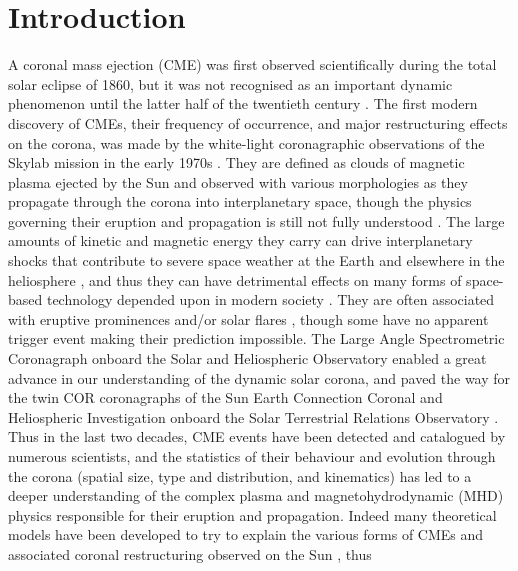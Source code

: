 \documentclass[namedreferences]{SolarPhysics}
\begin{document}
\begin{article}
\begin{opening}
%


\end{opening}

%

\section{Introduction}

A coronal mass ejection (CME) was first observed scientifically during the total solar eclipse of 1860, but it was not recognised as an important dynamic phenomenon until the latter half of the twentieth century \citep{1974A&A....34..235E}. The first modern discovery of CMEs, their frequency of  occurrence, and major restructuring effects on the corona, was made by the white-light coronagraphic observations of the Skylab mission in the early 1970s \citep{1974ApJ...187L..85M}. They are defined as clouds of magnetic plasma ejected by the Sun and observed with various morphologies as they propagate through the corona into interplanetary space, though the physics governing their eruption and propagation is still not fully understood \citep{2006SSRv..123....1K}. The large amounts of kinetic and magnetic energy they carry can drive interplanetary shocks that contribute to severe space weather at the Earth and elsewhere in the heliosphere \citep{2004Natur.432...78P, 2005AnGeo..23.1033S}, and thus they can have detrimental effects on many forms of space-based technology depended upon in modern society \citep{2007A&G....48f..11L, 2008sswe.rept.....C}. They are often associated with eruptive prominences \citep{2008AnGeo..26.3025F} and/or solar flares \citep{1985SoPh...98..369S, 2002ApJ...566L.117Z}, though some have no apparent trigger event \citep{2010ApJ...722..289M} making their prediction impossible. The Large Angle Spectrometric Coronagraph \citep[LASCO;][]{1995SoPh..162..357B} onboard the Solar and Heliospheric Observatory \citep[SOHO;][]{1995SoPh..162....1D} enabled a great advance in our understanding of the dynamic solar corona, and paved the way for the twin COR coronagraphs of the Sun Earth Connection Coronal and Heliospheric Investigation \citep[SECCHI;][]{2000SPIE.4139..259H} onboard the Solar Terrestrial Relations Observatory \citep[STEREO;][]{2008SSRv..136....5K}. Thus in the last two decades, CME events have been detected and catalogued by numerous scientists, and the statistics of their behaviour and evolution through the corona (spatial size, type and distribution, and kinematics) has led to a deeper understanding of the complex plasma and magnetohydrodynamic (MHD) physics responsible for their eruption and propagation. Indeed many theoretical models have been developed to try to explain the various forms of CMEs and associated coronal restructuring observed on the Sun \citep[see][and references therein]{2011LRSP....8....1C}, thus 
\end{article}
\end{document}
